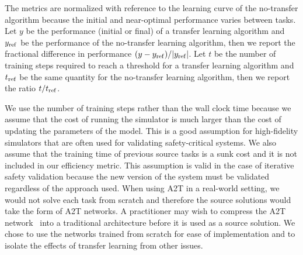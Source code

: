 The metrics are normalized with reference to the learning curve of the no-transfer algorithm because the initial and near-optimal performance varies between tasks. Let $y$ be the performance (initial or final) of a transfer learning algorithm and $y_{\rm ref}$ be the performance of the no-transfer learning algorithm, then we report the fractional difference in performance $(y - y_{\rm ref})/|y_{\rm ref}|$. Let $t$ be the number of training steps required to reach a threshold for a transfer learning algorithm and $t_{\rm ref}$ be the same quantity for the no-transfer learning algorithm, then we report the ratio $t / t_{\rm ref}$.

We use the number of training steps rather than the wall clock time because we assume that the cost of running the simulator is much larger than the cost of updating the parameters of the model. This is a good assumption for high-fidelity simulators that are often used for validating safety-critical systems. We also assume that the training time of previous source tasks is a sunk cost and it is not included in our efficiency metric. This assumption is valid in the case of iterative safety validation because the new version of the system must be validated regardless of the approach used. When using A2T in a real-world setting, we would not solve each task from scratch and therefore the source solutions would take the form of A2T networks. A practitioner may wish to compress the A2T network~\cite{julian2019deep} into a traditional architecture before it is used as a source solution. We chose to use the networks trained from scratch for ease of implementation and to isolate the effects of transfer learning from other issues.


